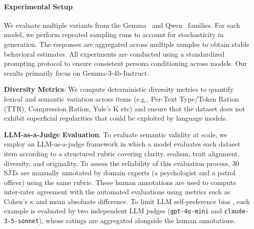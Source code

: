 \documentclass[11pt]{article}
\begin{document}

\paragraph{Experimental Setup}
We evaluate multiple variants from the Gemma~\citep{gemmateam2025gemma3technicalreport} and Qwen~\citep{yang2025qwen3technicalreport} families. For each model, we perform repeated sampling runs to account for stochasticity in generation. The responses are aggregated across multiple samples to obtain stable behavioral estimates. All experiments are conducted using a standardized prompting protocol to ensure consistent persona conditioning across models. Our results primarily focus on Gemma-3-4b-Instruct.

\noindent \textbf{Diversity Metrics}: We compute deterministic diversity metrics to quantify lexical and semantic variation across items (e.g., Per-Text Type/Token Ration (TTR), Compression Ration, Yule's K etc) and ensure that the dataset does not exhibit superficial regularities that could be exploited by language models.

\noindent\textbf{LLM-as-a-Judge Evaluation}: To evaluate semantic validity at scale, we employ an LLM-as-a-judge framework in which a model evaluates each dataset item according to a structured rubric covering clarity, realism, trait alignment, diversity, and originality. To assess the reliability of this evaluation process, 30 SJTs are manually annotated by domain experts (a psychologist and a patrol officer) using the same rubric. These human annotations are used to compute inter-rater agreement with the automated evaluations using metrics such as Cohen's \(\kappa\) \citep{cohen_kappa_original} and mean absoluate difference. To limit LLM self-preference bias \citep{roytburg2025breaking, roytburg2026are}, each example is evaluated by two independent LLM judges (\texttt{gpt-4o-mini} and \texttt{claude-3-5-sonnet}), whose ratings are aggregated alongside the human annotations.
\end{document}
